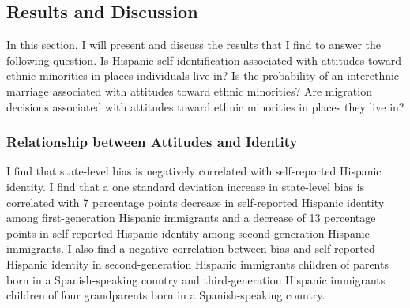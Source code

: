 \documentclass[12pt, fullpage]{article}
\begin{document}
\subsection{Results and Discussion} %
\label{sec:results}

In this section, I will present and discuss the results that I find to answer the following question. Is Hispanic self-identification associated with attitudes toward ethnic minorities in places individuals live in? Is the probability of an interethnic marriage associated with attitudes toward ethnic minorities? Are migration decisions associated with attitudes toward ethnic minorities in places they live in?

\subsubsection{Relationship between Attitudes and Identity}\label{sub:the_determinants_of_identity}

I find that state-level bias is negatively correlated with self-reported Hispanic identity. I find that a one standard deviation increase in state-level bias is correlated with 7 percentage points decrease in self-reported Hispanic identity among first-generation Hispanic immigrants and a decrease of 13 percentage points in self-reported Hispanic identity among second-generation Hispanic immigrants. I also find a negative correlation between bias and self-reported Hispanic identity in second-generation Hispanic immigrants children of parents born in a Spanish-speaking country and third-generation Hispanic immigrants children of four grandparents born in a Spanish-speaking country.


\end{document}

